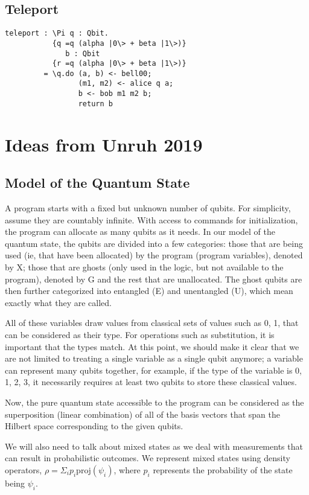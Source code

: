 \documentclass[acmsmall,nonacm,timestamp,review=false,anonymous=false]{acmart}
\begin{document}
\subsection{Teleport}
\begin{lstlisting}[language=QHaskell]
teleport : \Pi q : Qbit.
           {q =q (alpha |0\> + beta |1\>)}
              b : Qbit
           {r =q (alpha |0\> + beta |1\>)}
         = \q.do (a, b) <- bell00;
                 (m1, m2) <- alice q a;
                 b <- bob m1 m2 b;
                 return b
\end{lstlisting}

\section{Ideas from Unruh 2019}
\subsection{Model of the Quantum State}
A program starts with a fixed but unknown number of qubits. For simplicity, assume they are countably infinite.
With access to commands for initialization, the program can allocate as many qubits as it needs.
In our model of the quantum state, the qubits are divided into a few categories: those that are being used (ie, that have been allocated) by the program (program variables), denoted by X; those that are ghosts (only used in the logic, but not available to the program), denoted by G and the rest that are unallocated. The ghost qubits are then further categorized into entangled (E) and unentangled (U), which mean exactly what they are called.

All of these variables draw values from classical sets of values such as {0, 1}, that can be considered as their type. For operations such as substitution, it is important that the types match. At this point, we should make it clear that we are not limited to treating a single variable as a single qubit anymore; a variable can represent many qubits together, for example, if the type of the variable is {0, 1, 2, 3}, it necessarily requires at least two qubits to store these classical values.

Now, the pure quantum state accessible to the program can be considered as the superposition (linear combination) of all of the basis vectors that span the Hilbert space corresponding to the given qubits.

We will also need to talk about mixed states as we deal with measurements that can result in probabilistic outcomes. We represent mixed states using density operators, $\rho = \Sigma_i p_i \mathrm{proj}(\psi_i)$, where $p_i$ represents the probability of the state being $\psi_i$.
\end{document}
